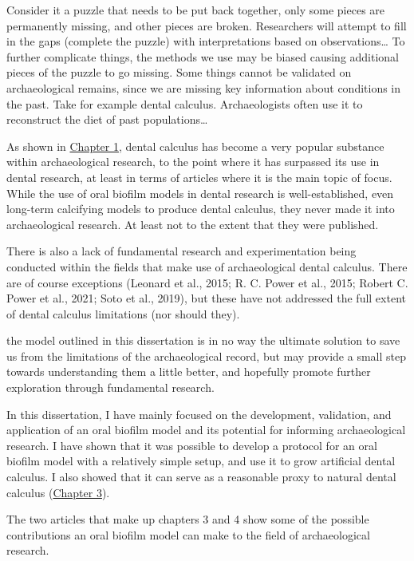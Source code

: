 \documentclass[
  letterpaper,
]{book}
\begin{document}
Consider it a puzzle that needs to be put back together, only some
pieces are permanently missing, and other pieces are broken. Researchers
will attempt to fill in the gaps (complete the puzzle) with
interpretations based on observations\ldots{} To further complicate
things, the methods we use may be biased causing additional pieces of
the puzzle to go missing. Some things cannot be validated on
archaeological remains, since we are missing key information about
conditions in the past. Take for example dental calculus. Archaeologists
often use it to reconstruct the diet of past populations\ldots{}

As shown in \protect\hyperlink{fig-plot-and-wordclouds}{Chapter 1},
dental calculus has become a very popular substance within
archaeological research, to the point where it has surpassed its use in
dental research, at least in terms of articles where it is the main
topic of focus. While the use of oral biofilm models in dental research
is well-established, even long-term calcifying models to produce dental
calculus, they never made it into archaeological research. At least not
to the extent that they were published.

There is also a lack of fundamental research and experimentation being
conducted within the fields that make use of archaeological dental
calculus. There are of course exceptions (Leonard et al., 2015; R. C.
Power et al., 2015; Robert C. Power et al., 2021; Soto et al., 2019),
but these have not addressed the full extent of dental calculus
limitations (nor should they).

the model outlined in this dissertation is in no way the ultimate
solution to save us from the limitations of the archaeological record,
but may provide a small step towards understanding them a little better,
and hopefully promote further exploration through fundamental research.

In this dissertation, I have mainly focused on the development,
validation, and application of an oral biofilm model and its potential
for informing archaeological research. I have shown that it was possible
to develop a protocol for an oral biofilm model with a relatively simple
setup, and use it to grow artificial dental calculus. I also showed that
it can serve as a reasonable proxy to natural dental calculus
(\protect\hyperlink{byoc-valid}{Chapter 3}).

The two articles that make up chapters 3 and 4 show some of the possible
contributions an oral biofilm model can make to the field of
archaeological research.
\end{document}
